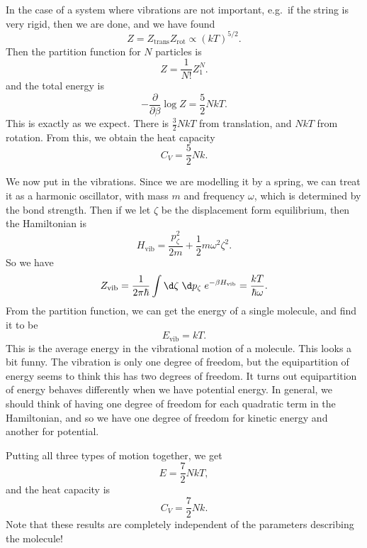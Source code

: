 \documentclass[a4paper]{article}
\begin{document}
\begin{eg}
  In the case of a system where vibrations are not important, e.g.\ if the string is very rigid, then we are done, and we have found
  \[
    Z = Z_{\mathrm{trans}} Z_{\mathrm{rot}} \propto (kT)^{5/2}.
  \]
  Then the partition function for $N$ particles is
  \[
    Z = \frac{1}{N!} Z_1^N.
  \]
  and the total energy is
  \[
    -\frac{\partial}{\partial \beta} \log Z = \frac{5}{2} NkT.
  \]
  This is exactly as we expect. There is $\frac{3}{2}NkT$ from translation, and $NkT$ from rotation. From this, we obtain the heat capacity
  \[
    C_V = \frac{5}{2} Nk.
  \]
\end{eg}
We now put in the vibrations. Since we are modelling it by a spring, we can treat it as a harmonic oscillator, with mass $m$ and frequency $\omega$, which is determined by the bond strength. Then if we let $\zeta$ be the displacement form equilibrium, then the Hamiltonian is
\[
  H_{\mathrm{vib}} = \frac{p_\zeta^2}{2m} + \frac{1}{2}m \omega^2 \zeta^2.
\]
So we have
\[
  Z_{\mathrm{vib}} = \frac{1}{2\pi \hbar} \int \d \zeta\;\d p_\zeta\;e^{-\beta H_{\mathrm{vib}}} = \frac{kT}{\hbar \omega}.
\]
From the partition function, we can get the energy of a single molecule, and find it to be
\[
  E_{\mathrm{vib}} = kT.
\]
This is the average energy in the vibrational motion of a molecule. This looks a bit funny. The vibration is only one degree of freedom, but the equipartition of energy seems to think this has two degrees of freedom. It turns out equipartition of energy behaves differently when we have potential energy. In general, we should think of having one degree of freedom for each quadratic term in the Hamiltonian, and so we have one degree of freedom for kinetic energy and another for potential.

Putting all three types of motion together, we get
\[
  E = \frac{7}{2} NkT,
\]
and the heat capacity is
\[
  C_V = \frac{7}{2}Nk.
\]
Note that these results are completely independent of the parameters describing the molecule!
\end{document}
